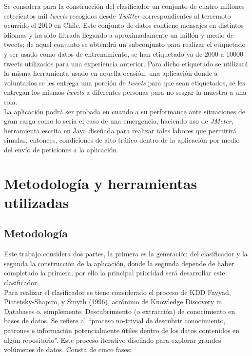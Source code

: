 Se considera para la construcción del clasificador un conjunto de cuatro millones setecientos mil \textit{tweets} recogidos desde \textit{Twitter} correspondientes al terremoto ocurrido el 2010 en Chile. Este conjunto de datos contiene mensajes en distintos idiomas y ha sido filtrada llegando a aproximadamente un millón y medio de tweets; de aquel conjunto se obtendrá un subconjunto para realizar el etiquetado y ser usado como datos de entrenamiento, se han etiquetado ya de 2000 a 10000 tweets utilizados para una experiencia anterior. Para dicho etiquetado se utilizará la misma herramienta usado en aquella ocasión: una aplicación donde a voluntarios se les entrega una porción de \textit{tweets} para que sean etiquetados, se les entregan los mismos \textit{tweets} a diferentes personas para no sesgar la muestra a una sola.\\

La aplicación podrá ser probada en cuando a su performance ante situaciones de gran carga como lo sería el caso de una emergencia, haciendo uso de \textit{JMeter}, herramienta escrita en Java diseñada para realizar tales labores que permitirá simular, entonces, condiciones de alto tráfico dentro de la aplicación por medio del envío de peticiones a la aplicación.



\section{Metodolog\'ia y herramientas utilizadas}
\label{intro:metodologia}

\subsection{Metodolog\'ia}
Este trabajo considera dos partes, la primera es la generación del clasificador y la segunda la construcción de la aplicación, donde la segunda depende de haber completado la primera, por ello la principal prioridad será desarrollar este clasificador.\\

Para realizar el clasificador se tiene considerado el proceso de KDD Fayyad, Piatetsky-Shapiro, y Smyth (1996), acrónimo de Knowledge Discovery in Databases o, simplemente, Descubrimiento (o extracción) de conocimiento en bases de datos. Se refiere al “proceso no-trivial de descubrir conocimiento, patrones e información potencialmente útiles dentro de los datos contenidos en algún repositorio”. Este proceso iterativo diseñado para explorar grandes volúmenes de datos. Consta de cinco fases:\\

